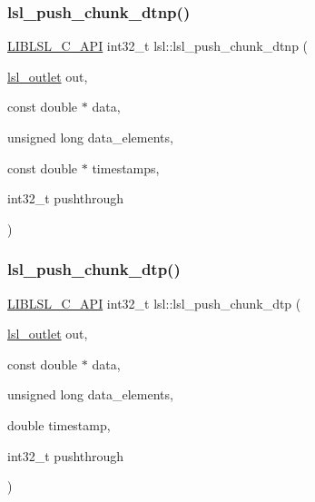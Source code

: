 \subsubsection{\texorpdfstring{lsl\+\_\+push\+\_\+chunk\+\_\+dtnp()}{lsl\_push\_chunk\_dtnp()}}
{\footnotesize\ttfamily \hyperlink{lsl__cpp_8h_aafd0ef1813e8be84a1420c4f1df64615}{L\+I\+B\+L\+S\+L\+\_\+\+C\+\_\+\+A\+PI} int32\+\_\+t lsl\+::lsl\+\_\+push\+\_\+chunk\+\_\+dtnp (\begin{DoxyParamCaption}\item[{\hyperlink{namespacelsl_abcf512b0f66dacf86c10b165995fd50b}{lsl\+\_\+outlet}}]{out,  }\item[{const double $\ast$}]{data,  }\item[{unsigned long}]{data\+\_\+elements,  }\item[{const double $\ast$}]{timestamps,  }\item[{int32\+\_\+t}]{pushthrough }\end{DoxyParamCaption})}

\mbox{\label{namespacelsl_afdd8325060d14312cb340bc2edcac10a}} 
\subsubsection{\texorpdfstring{lsl\+\_\+push\+\_\+chunk\+\_\+dtp()}{lsl\_push\_chunk\_dtp()}}
{\footnotesize\ttfamily \hyperlink{lsl__cpp_8h_aafd0ef1813e8be84a1420c4f1df64615}{L\+I\+B\+L\+S\+L\+\_\+\+C\+\_\+\+A\+PI} int32\+\_\+t lsl\+::lsl\+\_\+push\+\_\+chunk\+\_\+dtp (\begin{DoxyParamCaption}\item[{\hyperlink{namespacelsl_abcf512b0f66dacf86c10b165995fd50b}{lsl\+\_\+outlet}}]{out,  }\item[{const double $\ast$}]{data,  }\item[{unsigned long}]{data\+\_\+elements,  }\item[{double}]{timestamp,  }\item[{int32\+\_\+t}]{pushthrough }\end{DoxyParamCaption})}

\mbox{\label{namespacelsl_abaf77814f92eec3728670d14195b460b}} 
